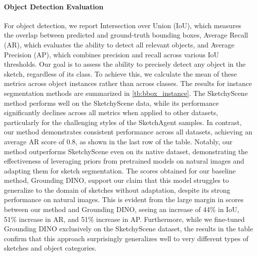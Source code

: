 \paragraph{Object Detection Evaluation}
For object detection, we report Intersection over Union (IoU), which measures the overlap between predicted and ground-truth bounding boxes, Average Recall (AR), which evaluates the ability to detect all relevant objects, and Average Precision (AP), which combines precision and recall across various IoU thresholds. Our goal is to assess the ability to precisely detect any object in the sketch, regardless of its class. To achieve this, we calculate the mean of these metrics across object instances rather than across classes. 
The results for instance segmentation methods are summarized in \cref{tb:bbox_instance}. 
The SketchyScene method performs well on the SketchyScene data, while its performance significantly declines across all metrics when applied to other datasets, particularly for the challenging styles of the SketchAgent samples. 
In contrast, our method demonstrates consistent performance across all datasets, achieving an average AR score of 0.8, as shown in the last row of the table. Notably, our method outperforms SketchyScene even on its native dataset, demonstrating the effectiveness of leveraging priors from pretrained models on natural images and adapting them for sketch segmentation.
The scores obtained for our baseline method, Grounding DINO, support our claim that this model struggles to generalize to the domain of sketches without adaptation, despite its strong performance on natural images. This is evident from the large margin in scores between our method and Grounding DINO, seeing an increase of 44\% in IoU, 51\% increase in AR, and 51\% increase in AP.  Furthermore, while we fine-tuned Grounding DINO exclusively on the SketchyScene dataset, the results in the table confirm that this approach surprisingly generalizes well to very different types of sketches and object categories.

